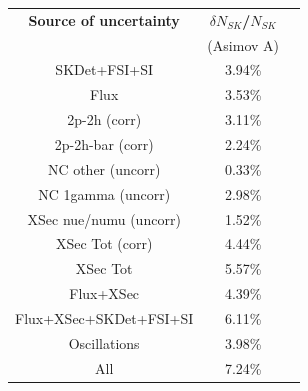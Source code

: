 



\begin{table}[htb]
\centering
\begin{tabular}{| c | c | c |}
\hline
  {\bf Source of uncertainty}    & \multicolumn{1}{c|}{{\bf ${\delta}N_{SK}$/$N_{SK}$}}\\
                                 & \multicolumn{1}{c|}{(Asimov A)}\\

\hline
\hline  SKDet+FSI+SI                   & 3.94\%                        \\
\hline
\hline
  Flux                           & 3.53\%                        \\
\hline
\hline
  2p-2h (corr)                     & 3.11\%                        \\
  2p-2h-bar (corr)                  & 2.24\%                        \\
  NC other (uncorr)              & 0.33\%                        \\
  NC 1gamma (uncorr)             & 2.98\%                        \\
  XSec nue/numu (uncorr)                 & 1.52\%                        \\
\hline  
  XSec Tot (corr)                  & 4.44\%                        \\
  XSec Tot                       & 5.57\%                        \\
\hline
\hline
  Flux+XSec                      & 4.39\%                        \\
\hline
\hline
  Flux+XSec+SKDet+FSI+SI         & 6.11\%                        \\
\hline
\hline
  Oscillations                   & 3.98\%                        \\
\hline
\hline
  All                            & 7.24\%                        \\
\hline
\hline


\end{tabular}
\end{table}
